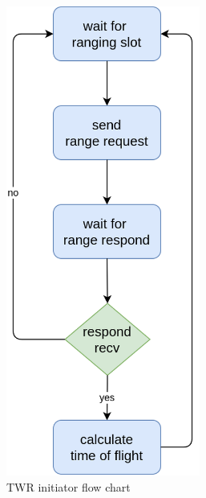 \documentclass[\main/thesis.tex]{subfiles}
\begin{document}
\begin{figure}[H]
    \centering
    \begin{subfigure}[b]{0.47\textwidth}
        \begin{center}
            \includegraphics[width=0.7\textwidth]{twr_initiator.png}
        \end{center}
        \caption{TWR initiator flow chart}
        \label{fig:twr_initiator}
    \end{subfigure}
    \hfill
    \begin{subfigure}[b]{0.47\textwidth}
        \begin{center}

\end{center}
\end{subfigure}
\end{figure}
\end{document}
